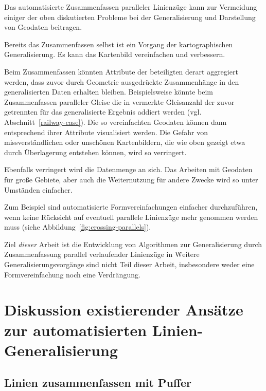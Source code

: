 \documentclass[../main/thesis.tex]{subfiles}
\begin{document}
Das automatisierte Zusammenfassen paralleler Linienzüge kann zur Vermeidung einiger der oben diskutierten Probleme bei der Generalisierung und Darstellung von Geodaten beitragen.

Bereits das Zusammenfassen selbst ist ein Vorgang der kartographischen Generalisierung.
Es kann das Kartenbild vereinfachen und verbessern.

Beim Zusammenfassen könnten Attribute der beteiligten  derart aggregiert werden, dass zuvor durch Geometrie ausgedrückte Zusammenhänge in den generalisierten Daten erhalten bleiben.
Beispielsweise könnte beim Zusammenfassen paralleler Gleise die in  vermerkte Gleisanzahl der zuvor getrennten  für das generalisierte Ergebnis addiert werden (vgl. Abschnitt~\ref{railway-case}).
Die so vereinfachten Geodaten können dann entsprechend ihrer Attribute visualisiert werden.
Die Gefahr von missverständlichen oder unschönen Kartenbildern, die wie oben gezeigt etwa durch Überlagerung entstehen können, wird so verringert.

Ebenfalls verringert wird die Datenmenge an sich.
Das Arbeiten mit Geodaten für große Gebiete, aber auch die Weiternutzung für andere Zwecke wird so unter Umständen einfacher.

Zum Beispiel sind automatisierte Formvereinfachungen einfacher durchzuführen, wenn keine Rücksicht auf eventuell parallele Linienzüge mehr genommen werden muss (siehe Abbildung~\ref{fig:crossing-parallels}).


Ziel \emph{dieser} Arbeit ist die Entwicklung von Algorithmen zur Generalisierung durch Zusammenfassung parallel verlaufender Linienzüge in \osm\.
Weitere Generalisierungsvorgänge sind nicht Teil dieser Arbeit, insbesondere weder eine Formvereinfachung noch eine Verdrängung.



\section[Diskussion existierender Ansätze]{Diskussion existierender Ansätze zur automatisierten Linien-Generalisierung}
\label{ch:existing-approaches}

\subsection{Linien zusammenfassen mit Puffer}
\label{ch:buffer}
\end{document}
